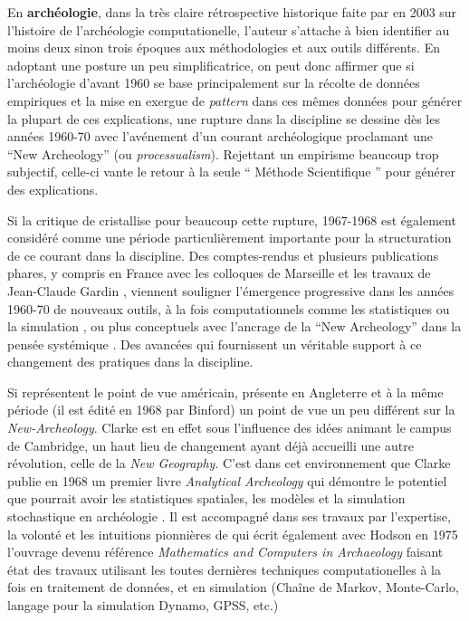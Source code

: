 \medskip

En \textbf{archéologie}, dans la très claire rétrospective historique faite par \textcite{Lock2003} en 2003 sur l'histoire de l'archéologie computationelle, l'auteur s'attache à bien identifier au moins deux sinon trois époques aux méthodologies et aux outils différents. En adoptant une posture un peu simplificatrice, on peut donc affirmer que si l'archéologie d'avant 1960 se base principalement sur la récolte de données empiriques et la mise en exergue de \textit{pattern} dans ces mêmes données pour générer la plupart de ces explications, une rupture dans la discipline se dessine dès les années 1960-70 avec l'avénement d'un courant archéologique proclamant une \foreignquote{english}{New Archeology} (ou \textit{processualism}). Rejettant un empirisme beaucoup trop subjectif, celle-ci vante le retour à la seule \enquote{ Méthode Scientifique } pour générer des explications.

Si la critique de \textcite{Binford1962} cristallise pour beaucoup cette rupture, 1967-1968 est également considéré comme une période particulièrement importante pour la structuration de ce courant dans la discipline. Des comptes-rendus \autocites{Cowgill1967, Whallon1972} et plusieurs publications phares, y compris en France avec les colloques de Marseille et les travaux de Jean-Claude Gardin \autocites{Gardin1971, Dallas2015}, viennent souligner l'émergence progressive dans les années 1960-70 de nouveaux outils, à la fois computationnels comme les statistiques ou la simulation \autocite{Clarke1968}, ou plus conceptuels avec l'ancrage de la \foreignquote{english}{New Archeology} dans la pensée systémique \autocites{Clarke1968, Flannery1968, Binford1968}. Des avancées qui fournissent un véritable support à ce changement des pratiques dans la discipline.

Si \textcite{Binford1968,Binford1972} représentent le point de vue américain, \textcite{Clarke1968} présente en Angleterre et à la même période (il est édité en 1968 par Binford) un point de vue un peu différent sur la \textit{New-Archeology}. Clarke est en effet sous l'influence des idées animant le campus de Cambridge, un haut lieu de changement ayant déjà accueilli une autre révolution, celle de la \textit{New Geography}. C'est dans cet environnement que Clarke publie en 1968 un premier livre \textit{Analytical Archeology} qui démontre le potentiel que pourrait avoir les statistiques spatiales, les modèles et la simulation stochastique en archéologie \autocites{Clarke1968, Clarke1972, Gardin1970}. Il est accompagné dans ses travaux par l'expertise, la volonté et les intuitions pionnières de \textcite{Doran1970} qui écrit également avec Hodson en 1975 l'ouvrage devenu référence \textit{Mathematics and Computers in Archaeology} \autocite{Doran1975} faisant état des travaux utilisant les toutes dernières techniques computationelles à la fois en traitement de données, et en simulation (Chaîne de Markov, Monte-Carlo, langage pour la simulation Dynamo, GPSS, etc.)

